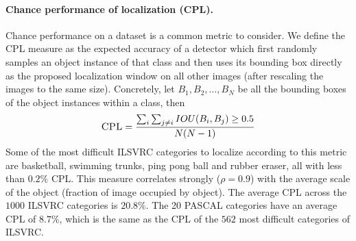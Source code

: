 \begin{appendices}

\paragraph{Chance performance of localization (CPL).} Chance performance on a dataset is a common metric to consider. We define the CPL measure as the expected accuracy of a detector which first randomly samples an object instance of that class and then uses its bounding box directly as the proposed localization window on all other images (after rescaling the images to the same size). Concretely, let $B_1,B_2,\dots,B_N$ be all the bounding boxes of the object instances within a class, then
\begin{equation}
\label{cpleq}
\mbox{\sc CPL} = \frac{\sum_i \sum_{j \neq i} IOU(B_i,B_j)\geq 0.5}{N(N-1)}
\end{equation}
Some of the most difficult ILSVRC categories to localize according to this metric are basketball, swimming trunks, ping pong ball and rubber eraser, all with less than $0.2\%$ CPL. This measure correlates strongly ($\rho = 0.9$) with the average scale of the object (fraction of image occupied by object). The average CPL across the $1000$ ILSVRC categories is $20.8\%$. The 20 PASCAL categories have an average CPL of $8.7\%$, which is the same as the CPL of the $562$ most difficult categories of ILSVRC.


\end{appendices}
